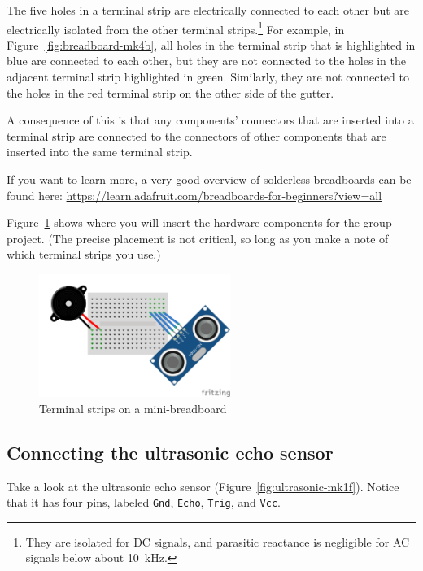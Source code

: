 The five holes in a terminal strip are electrically connected to each other but are electrically isolated from the other terminal strips.\footnote{
    They are isolated for DC signals, and parasitic reactance is negligible for AC signals below about 10~kHz.
}
For example, in Figure~\ref{fig:breadboard-mk4b}, all holes in the terminal strip that is highlighted in blue are connected to each other,
but they are not connected to the holes in the adjacent terminal strip highlighted in green.
Similarly, they are not connected to the holes in the red terminal strip on the other side of the gutter.

A consequence of this is that any components' connectors that are inserted into a terminal strip are connected to the connectors of other components that are inserted into the same terminal strip.

If you want to learn more, a very good overview of solderless breadboards can be found here: \url{https://learn.adafruit.com/breadboards-for-beginners?view=all}

Figure~\ref{fig:breadboard-with-components-mk4b} shows where you will insert the hardware components for the group project.
(The precise placement is not critical, so long as you make a note of which terminal strips you use.)

\begin{figure}
    \centering
    \includegraphics[height=4cm]{hardware/mk4b/breadboard-with-components}
    \caption{Terminal strips on a mini-breadboard \label{fig:breadboard-with-components-mk4b}}
\end{figure}


\subsection{Connecting the ultrasonic echo sensor}

Take a look at the ultrasonic echo sensor (Figure~\ref{fig:ultrasonic-mk1f}).
Notice that it has four pins, labeled \texttt{Gnd}, \texttt{Echo}, \texttt{Trig}, and \texttt{Vcc}.

